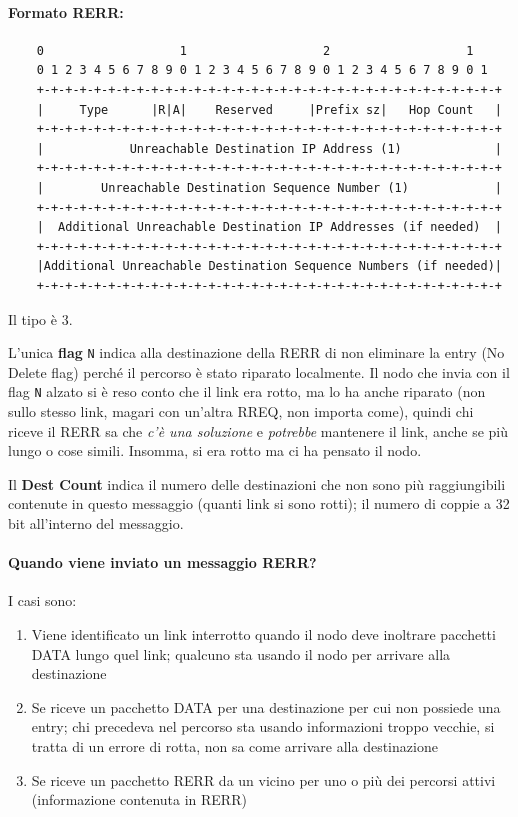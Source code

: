 \paragraph{Formato RERR:}
\begin{verbatim}
	0                   1                   2                   1
	0 1 2 3 4 5 6 7 8 9 0 1 2 3 4 5 6 7 8 9 0 1 2 3 4 5 6 7 8 9 0 1
	+-+-+-+-+-+-+-+-+-+-+-+-+-+-+-+-+-+-+-+-+-+-+-+-+-+-+-+-+-+-+-+-+
	|     Type      |R|A|    Reserved     |Prefix sz|   Hop Count   |
	+-+-+-+-+-+-+-+-+-+-+-+-+-+-+-+-+-+-+-+-+-+-+-+-+-+-+-+-+-+-+-+-+
	|            Unreachable Destination IP Address (1)             |
	+-+-+-+-+-+-+-+-+-+-+-+-+-+-+-+-+-+-+-+-+-+-+-+-+-+-+-+-+-+-+-+-+
	|        Unreachable Destination Sequence Number (1)            |
	+-+-+-+-+-+-+-+-+-+-+-+-+-+-+-+-+-+-+-+-+-+-+-+-+-+-+-+-+-+-+-+-+
	|  Additional Unreachable Destination IP Addresses (if needed)  |
	+-+-+-+-+-+-+-+-+-+-+-+-+-+-+-+-+-+-+-+-+-+-+-+-+-+-+-+-+-+-+-+-+
	|Additional Unreachable Destination Sequence Numbers (if needed)|
	+-+-+-+-+-+-+-+-+-+-+-+-+-+-+-+-+-+-+-+-+-+-+-+-+-+-+-+-+-+-+-+-+
\end{verbatim}

Il tipo è 3. 

L'unica \textbf{flag} \texttt{N} indica alla destinazione della RERR di non eliminare la entry (No Delete flag) perché il percorso è stato riparato localmente. Il nodo che invia con il flag \texttt{N} alzato si è reso conto che il link era rotto, ma lo ha anche riparato (non sullo stesso link, magari con un'altra RREQ, non importa come), quindi chi riceve il RERR sa che \textit{c'è una soluzione} e \textit{potrebbe} mantenere il link, anche se più lungo o cose simili. Insomma, si era rotto ma ci ha pensato il nodo.

Il \textbf{Dest Count} indica il numero delle destinazioni che non sono più raggiungibili contenute in questo messaggio (quanti link si sono rotti); il numero di coppie a 32 bit all'interno del messaggio.


\paragraph{Quando viene inviato un messaggio RERR?} I casi sono:
\begin{enumerate}
	\item Viene identificato un link interrotto quando il nodo deve inoltrare pacchetti DATA lungo quel link; qualcuno sta usando il nodo per arrivare alla destinazione
	
    \item Se riceve un pacchetto DATA per una destinazione per cui non possiede una entry; chi precedeva nel percorso sta usando informazioni troppo vecchie, si tratta di un errore di rotta, non sa come arrivare alla destinazione
	
    \item Se riceve un pacchetto RERR da un vicino per uno o più dei percorsi attivi (informazione contenuta in RERR)
\end{enumerate}

